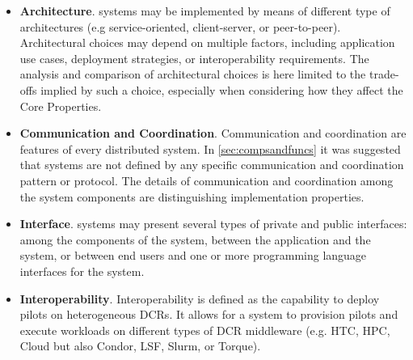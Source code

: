 \documentclass{sig-alternate}
\begin{document}
\begin{itemize}

\item \textbf{Architecture}. \pilot systems may be implemented by means of
  different type of architectures (e.g service-oriented, client-server, or
  peer-to-peer). Architectural choices may depend on multiple factors,
  including application use cases, deployment strategies, or interoperability
  requirements.  The analysis and comparison of architectural choices is here
  limited to the trade-offs implied by such a choice, especially when
  considering how they affect the Core Properties.

\item \textbf{Communication and Coordination}. Communication and coordination
  are features of every distributed system. In \ref{sec:compsandfuncs} it was
  suggested that \pilot systems are not defined by any specific communication
  and coordination pattern or protocol. The details of communication and
  coordination among the \pilot system components are distinguishing
  implementation properties.


\item \textbf{Interface}. \pilot systems may present several types of private
  and public interfaces: among the components of the \pilot system, between the
  application and the \pilot system, or between end users and one or more
  programming language interfaces for the \pilot system.

\item \textbf{Interoperability}. Interoperability is defined as the capability
  to deploy pilots on heterogeneous DCRs. It allows for a \pilot
  system to provision pilots and execute workloads on different types of
  DCR middleware (e.g. HTC, HPC, Cloud but also Condor, LSF, Slurm, or Torque).


\end{itemize}
\end{document}
